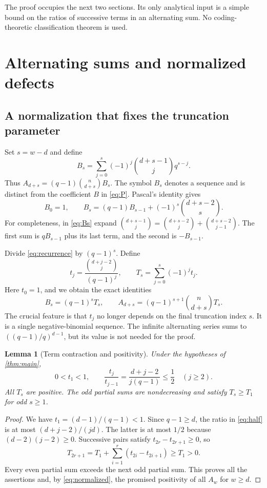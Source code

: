 \documentclass[11pt,letterpaper]{article}
\numberwithin{equation}{section}
\newtheorem{lemma}[theorem]{Lemma}
\theoremstyle{definition}
\begin{document}
The proof occupies the next two sections. Its only analytical input
is a simple bound on the ratios of successive terms in an alternating
sum. No coding-theoretic classification theorem is used.

\section{Alternating sums and normalized defects}

\subsection{A normalization that fixes the truncation parameter}
Set $s=w-d$ and define
\begin{equation}\label{eq:Bs}
 B_s=\sum_{j=0}^s(-1)^j\binom{d+s-1}{j}q^{s-j}.
\end{equation}
Thus $A_{d+s}=(q-1)\binom n{d+s}B_s$. The symbol $B_s$ denotes a
sequence and is distinct from the coefficient $B$ in \eqref{eq:P}.
Pascal's identity gives
\begin{equation}\label{eq:recurrence}
 B_0=1,\qquad
 B_s=(q-1)B_{s-1}+(-1)^s\binom{d+s-2}{s}.
\end{equation}
For completeness, in \eqref{eq:Bs} expand
$\binom{d+s-1}{j}=\binom{d+s-2}{j}+\binom{d+s-2}{j-1}$.
The first sum is $qB_{s-1}$ plus its last term, and the second is
$-B_{s-1}$.

Divide \eqref{eq:recurrence} by $(q-1)^s$. Define
\begin{equation}\label{eq:terms}
 t_j=\frac{\binom{d+j-2}{j}}{(q-1)^j},\qquad
 T_s=\sum_{j=0}^s(-1)^jt_j.
\end{equation}
Here $t_0=1$, and we obtain the exact identities
\begin{equation}\label{eq:normalized}
 B_s=(q-1)^sT_s,\qquad
 A_{d+s}=(q-1)^{s+1}\binom n{d+s}T_s.
\end{equation}
The crucial feature is that $t_j$ no longer depends on the final
truncation index $s$. It is a single negative-binomial sequence.
The infinite alternating series sums to
$((q-1)/q)^{d-1}$, but its value is not needed for the proof.

\begin{lemma}[Term contraction and positivity]\label{lem:terms}
Under the hypotheses of \cref{thm:main},
\begin{equation}\label{eq:half}
 0<t_1<1,\qquad
 \frac{t_j}{t_{j-1}}=
 \frac{d+j-2}{j(q-1)}\le\frac12\quad(j\ge2).
\end{equation}
All $T_s$ are positive. The odd partial sums are nondecreasing and
satisfy $T_s\ge T_1$ for odd $s\ge1$.
\end{lemma}
\begin{proof}
We have $t_1=(d-1)/(q-1)<1$. Since $q-1\ge d$, the ratio in
\eqref{eq:half} is at most $(d+j-2)/(jd)$. The latter is at most
$1/2$ because $(d-2)(j-2)\ge0$.
Successive pairs satisfy $t_{2r}-t_{2r+1}\ge0$, so
\[
 T_{2r+1}=T_1+\sum_{i=1}^r(t_{2i}-t_{2i+1})\ge T_1>0.
\]
Every even partial sum exceeds the next odd partial sum. This proves
all the assertions and, by \eqref{eq:normalized}, the promised
positivity of all $A_w$ for $w\ge d$.
\end{proof}
\end{document}
